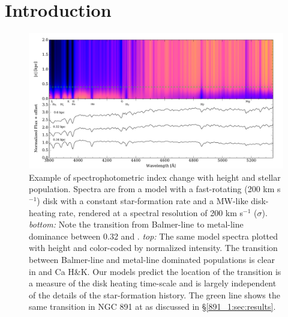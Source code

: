 \section{Introduction}
\label{891_1:sec:introduction}

\begin{figure}
  \centering
  \includegraphics[width=\textwidth]{891_1/figs/mab_stack.pdf}
  \caption[Heating signature in Milky Way
  model]{\label{891_1:fig:MW_heating}\fixspacing Example of
    spectrophotometric index change with height and stellar
    population. Spectra are from a model with a fast-rotating (200 km
    s$^{-1}$) disk with a constant star-formation rate and a MW-like
    disk-heating rate, rendered at a spectral resolution of 200 km
    s$^{-1}$ ($\sigma$).  \emph{bottom:} Note the transition from
    Balmer-line to metal-line dominance between 0.32 and
    . \emph{top:} The same model spectra plotted with
    height and color-coded by normalized intensity. The transition
    between Balmer-line and metal-line dominated populations is clear
    in \Hda and Ca H\&K. Our models predict the location of the
    transition is a measure of the disk heating time-scale and is
    largely independent of the details of the star-formation
    history. The green line shows the same transition in NGC 891 at
     as discussed in \S\ref{891_1:sec:results}.}
\end{figure}

